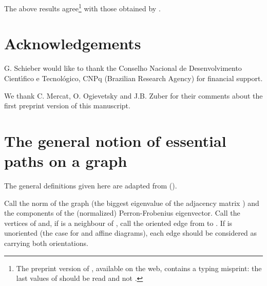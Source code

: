 \documentclass[a4paper,11pt]{article}
\let\sect=\section
\def\section{\newpage\sect}
\begin{document}
The above results agree\footnote{The preprint version of \cite{PetZub:Oc},
available on
the web, contains a typing misprint: the last values of \coordHE{} should be
read \coordHE{} and not \coordHE{}.}
with those obtained by \cite{PetZub:Oc}.




\section{Acknowledgements}

G. Schieber would like to thank the Conselho Nacional de Desenvolvimento
Cient\'{\i}fico e Tecnol\'ogico, CNPq (Brazilian Research Agency) for financial
support.

We thank C. Mercat, O. Ogievetsky and J.B. Zuber for their comments about the first preprint version
of this manuscript.


\appendix

\section{The general notion of essential paths on a graph \coordHE{}}

The general definitions given here are adapted from (\cite{Ocneanu:paths}).

Call \myHighlight{$\beta$}\coordHE{} the norm of the graph \coordHE{} (the biggest eigenvalue of  the
adjacency matrix \coordHE{})
and  \coordHE{} the components of the (normalized) Perron-Frobenius eigenvector.
Call \coordHE{} the vertices of \coordHE{} and, if
\coordHE{} is a neighbour of
\coordHE{}, call \coordHE{} the oriented edge
from \coordHE{} to \coordHE{}. If \coordHE{} is unoriented (the case for \coordHE{}
and affine \coordHE{} diagrams), each edge should be considered  as carrying
both orientations.
\end{document}
